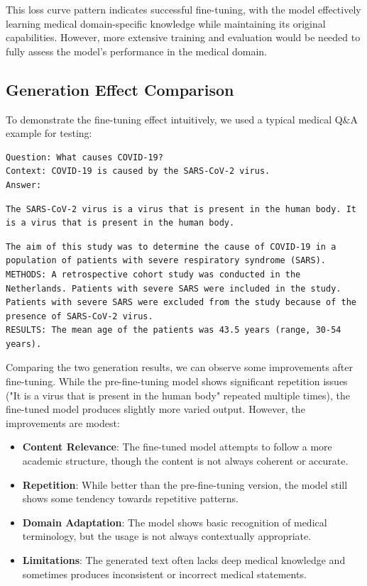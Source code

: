 \documentclass[12pt,oneside]{article}
\begin{document}
This loss curve pattern indicates successful fine-tuning, with the model effectively learning medical domain-specific knowledge while maintaining its original capabilities. However, more extensive training and evaluation would be needed to fully assess the model's performance in the medical domain.

\subsection{Generation Effect Comparison}

To demonstrate the fine-tuning effect intuitively, we used a typical medical Q\&A example for testing:

\begin{lstlisting}[caption=Input Prompt]
Question: What causes COVID-19?
Context: COVID-19 is caused by the SARS-CoV-2 virus.
Answer:
\end{lstlisting}

\begin{lstlisting}[caption=Pre-fine-tuning Generation]
The SARS-CoV-2 virus is a virus that is present in the human body. It is a virus that is present in the human body.
\end{lstlisting}

\begin{lstlisting}[caption=Post-fine-tuning Generation]
The aim of this study was to determine the cause of COVID-19 in a population of patients with severe respiratory syndrome (SARS).
METHODS: A retrospective cohort study was conducted in the Netherlands. Patients with severe SARS were included in the study. Patients with severe SARS were excluded from the study because of the presence of SARS-CoV-2 virus.
RESULTS: The mean age of the patients was 43.5 years (range, 30-54 years).
\end{lstlisting}

Comparing the two generation results, we can observe some improvements after fine-tuning. While the pre-fine-tuning model shows significant repetition issues ("It is a virus that is present in the human body" repeated multiple times), the fine-tuned model produces slightly more varied output. However, the improvements are modest:

\begin{itemize}
\item \textbf{Content Relevance}: The fine-tuned model attempts to follow a more academic structure, though the content is not always coherent or accurate.
\item \textbf{Repetition}: While better than the pre-fine-tuning version, the model still shows some tendency towards repetitive patterns.
\item \textbf{Domain Adaptation}: The model shows basic recognition of medical terminology, but the usage is not always contextually appropriate.
\item \textbf{Limitations}: The generated text often lacks deep medical knowledge and sometimes produces inconsistent or incorrect medical statements.
\end{itemize}
\end{document}

